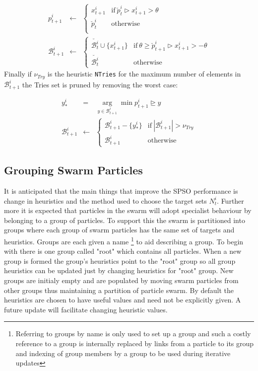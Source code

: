 \documentclass[a4paper,oneside,english]{book}
\numberwithin{equation}{section}
\numberwithin{figure}{section}
\begin{document}
\begin{align}
	p^i_{t+1}&\leftarrow& \left\lbrace
	\begin{array}{cc}
		x^i_{t+1}&\mathrm{ if}\: \breve{p}^i_t \rhd x^i_{t+1} > \theta \\
		\breve{p}^i_t & \mathrm{otherwise} \\	
	\end{array} \right. \\
	\mathcal{B}^i_{t+1}&\leftarrow& \left\lbrace
		\begin{array}{cc}
				\breve{\mathcal{B}^i_t} \cup \{x^i_{t+1}\}&\mathrm{ if}\: 
				\theta\geq \breve{p}^i_{t+1} \rhd x^i_{t+1} > -\theta \\
				\breve{\mathcal{B}^i_t}  & \mathrm{otherwise} 	
		\end{array} \right. 
\end{align}
Finally if $\nu_{Try}$ is the heuristic \texttt{NTries} for the maximum number of elements in $ \mathcal{B}^i_{t+1}$ the Tries set is pruned by removing the worst case:

\begin{align}
	y^i_* &= &  \underset{y \in \mathcal{B}^i_{t+1}}{\arg } \min p^i_{t+1} \unrhd y \\
		\mathcal{B}^i_{t+1}&\leftarrow& \left\lbrace
	\begin{array}{cc}
		\mathcal{B}^i_{t+1} - \{ y^i_*\} &
		\mathrm{ if}\: 
			|\mathcal{B}^i_{t+1}| > \nu_{Try}\\
		\mathcal{B}^i_{t+1}  & \mathrm{otherwise}	
	\end{array} \right. 
\end{align}

\subsection{Grouping Swarm Particles } 
It is anticipated  that the main things that improve the SPSO performance is change in heuristics and the method used to choose the target sets $N_t^i$. Further more it is expected that particles in the swarm will adopt specialist behaviour by belonging to a group of particles. To support this the swarm is  partitioned into groups where each group of swarm particles has the same set of targets and heuristics. Groups are each given a name  \footnote{Referring to groups by name is only used to set up a group and such a costly reference to a group is internally replaced by links from a particle to its group and indexing of group members by a group to be used during iterative updates} to aid describing a group. To begin with there is one group called "root" which contains all particles. When a new group is formed the group's  heuristics  point to the "root" group so all group heuristics  can be updated  just by changing  heuristics for "root" group. New groups are  initialy empty and are populated by moving swarm particles from other groups thus maintaining a partition of particle swarm. By default the heuristics are chosen to have useful values and need not be explicitly given. A future update will facilitate changing heuristic values.             
\end{document}
